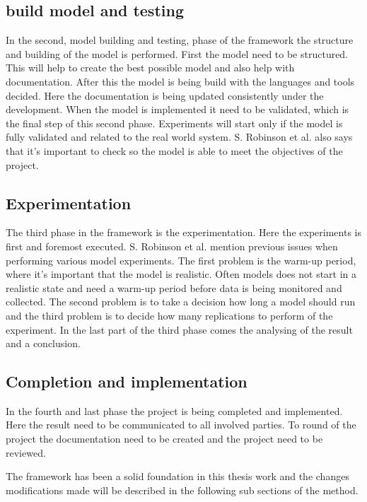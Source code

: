 \subsection{build model and testing}\label{sec:methodFrameworkBuildTest}
In the second, model building and testing, phase of the framework the structure and building of the model is performed.
First the model need to be structured. 
This will help to create the best possible model and also help with documentation.
After this the model is being build with the languages and tools decided.
Here the documentation is being updated consistently under the development.
When the model is implemented it need to be validated, which is the final step of this second phase.
Experiments will start only if the model is fully validated and related to the real world system.
S. Robinson et al. also says that it's important to check so the model is able to meet the objectives of the project.


\subsection{Experimentation}\label{sec:methodFrameworkExperimentation}
The third phase in the framework is the experimentation.
Here the experiments is first and foremost executed.
S. Robinson et al. mention previous issues when performing various model experiments.
The first problem is the warm-up period, where it's important that the model is realistic.
Often models does not start in a realistic state and need a warm-up period before data is being monitored and collected.
The second problem is to take a decision how long a model should run and the third problem is to decide how many replications to perform of the experiment.
In the last part of the third phase comes the analysing of the result and a conclusion.


\subsection{Completion and implementation}\label{sec:methodFrameworkCompletionImplementation}
In the fourth and last phase the project is being completed and implemented.
Here the result need to be communicated to all involved parties.
To round of the project the documentation need to be created and the project need to be reviewed.

\bigskip

The framework has been a solid foundation in this thesis work and the changes modifications made will be described in the following sub sections of the method.
